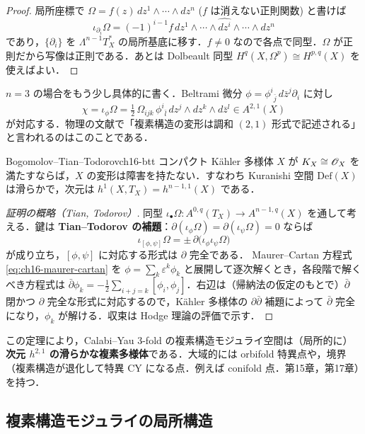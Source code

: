 \begin{proof}
局所座標で $\Omega=f(z)\,dz^1\wedge\cdots\wedge dz^n$ ($f$ は消えない正則関数) と書けば
\[
\iota_{\partial_i}\Omega=(-1)^{i-1}f\,dz^1\wedge\cdots\wedge\widehat{dz^i}\wedge\cdots\wedge dz^n
\]
であり，$\{\partial_i\}$ を $\Lambda^{n-1}T^*_X$ の局所基底に移す．$f\neq0$ なので各点で同型．$\Omega$ が正則だから写像は正則である．あとは Dolbeault 同型 $H^q(X,\Omega^p)\cong H^{p,q}(X)$ を使えばよい．
\end{proof}

$n=3$ の場合をもう少し具体的に書く．Beltrami 微分 $\phi=\phi^{i}{}_{\bar j}\,d\bar z^{j}\partial_i$ に対し
\[
\chi=\iota_\phi\Omega=\tfrac12\,\Omega_{ijk}\,\phi^{i}{}_{\bar l}\,dz^j\wedge dz^k\wedge d\bar z^{l}\in A^{2,1}(X)
\]
が対応する．物理の文献で「複素構造の変形は調和 $(2,1)$ 形式で記述される」と言われるのはこのことである．

\begin{mythm}{Bogomolov--Tian--Todorov}{ch16-btt}
コンパクト K\"ahler 多様体 $X$ が $K_X\cong\mathscr{O}_X$ を満たすならば，$X$ の変形は障害を持たない．すなわち Kuranishi 空間 $\mathrm{Def}(X)$ は滑らかで，次元は $h^1(X,T_X)=h^{n-1,1}(X)$ である．
\end{mythm}

\begin{proof}[証明の概略（Tian, Todorov）]
同型 $\iota_\bullet\Omega:A^{0,q}(T_X)\to A^{n-1,q}(X)$ を通して考える．鍵は \textbf{Tian--Todorov の補題}：$\partial(\iota_\phi\Omega)=\partial(\iota_\psi\Omega)=0$ ならば
\[
\iota_{[\phi,\psi]}\Omega=\pm\,\partial\bigl(\iota_\phi\iota_\psi\Omega\bigr)
\]
が成り立ち，$[\phi,\psi]$ に対応する形式は $\partial$ 完全である．
Maurer--Cartan 方程式 \eqref{eq:ch16-maurer-cartan} を $\phi=\sum_k\varepsilon^k\phi_k$ と展開して逐次解くとき，各段階で解くべき方程式は $\bar\partial\phi_k=-\tfrac12\sum_{i+j=k}[\phi_i,\phi_j]$．右辺は（帰納法の仮定のもとで）$\bar\partial$ 閉かつ $\partial$ 完全な形式に対応するので，K\"ahler 多様体の $\partial\bar\partial$ 補題によって $\bar\partial$ 完全になり，$\phi_k$ が解ける．収束は Hodge 理論の評価で示す．
\end{proof}

この定理により，Calabi--Yau 3-fold の複素構造モジュライ空間は（局所的に）\textbf{次元 $h^{2,1}$ の滑らかな複素多様体}である．大域的には orbifold 特異点や，境界（複素構造が退化して特異 CY になる点．例えば conifold 点．第15章，第17章）を持つ．

\subsection{複素構造モジュライの局所構造}

